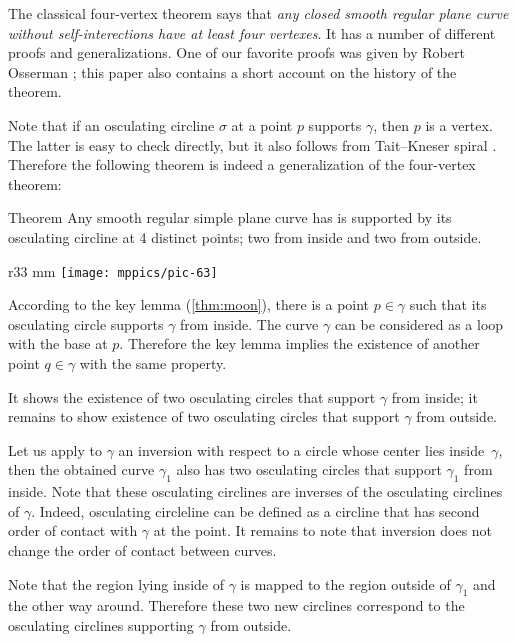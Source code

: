 \documentclass{article}
\begin{document}
The classical four-vertex theorem says that \emph{any closed smooth regular plane curve without self-interections have at least four vertexes}.
It has a number of different proofs and generalizations.
One of our favorite proofs was given by Robert Osserman \cite{osserman}; this paper also contains a short account on the history of the theorem.

Note that if an osculating circline $\sigma$ at a point $p$ supports $\gamma$, then $p$ is a vertex.
The latter is easy to check directly, but it also follows from Tait--Kneser spiral \cite{ghys-tabachnikov-timorin}.
Therefore the following theorem is indeed a generalization of the four-vertex theorem:

\begin{thm}{Theorem}\label{thm:4-vert}
Any smooth regular simple plane curve has is supported by its osculating circline at 4 distinct points; two from inside and two from outside.
\end{thm}

{

\begin{wrapfigure}{r}{33 mm}
\vskip-6mm
\centering
\texttt{[image: mppics/pic-63]}
\vskip0mm
\end{wrapfigure}

According to the key lemma (\ref{thm:moon}), there is a point $p\in\gamma$ such that its osculating circle supports $\gamma$ from inside.
The curve $\gamma$ can be considered as a loop with the base at $p$.
Therefore the key lemma implies the existence of another point $q\in\gamma$ with the same property.

It shows the existence of two osculating circles that support $\gamma$ from inside;
it remains to show existence of two osculating circles that support $\gamma$ from outside.

}

Let us apply to $\gamma$ an inversion with respect to a circle whose center lies inside~$\gamma$, then the obtained curve $\gamma_1$ also has  two osculating circles that support $\gamma_1$ from inside.
Note that these osculating circlines are inverses of the osculating circlines of $\gamma$.
Indeed, osculating circleline can be defined as a circline that has second order of contact with $\gamma$ at the point.
It remains to note that inversion does not change the order of contact between curves.

Note that the region lying inside of $\gamma$ is mapped to the region outside of $\gamma_1$ and the other way around.
Therefore these two new circlines correspond to the osculating circlines supporting $\gamma$ from outside.
\qeds
\end{document}
